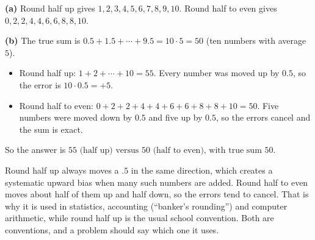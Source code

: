 \textbf{(a)} Round half up gives $1,2,3,4,5,6,7,8,9,10$. Round half to even gives $0,2,2,4,4,6,6,8,8,10$.

\textbf{(b)} The true sum is $0.5+1.5+\cdots+9.5=10\cdot5=50$ (ten numbers with average $5$).
\begin{itemize}
\item Round half up: $1+2+\cdots+10=55$. Every number was moved up by $0.5$, so the error is $10\cdot0.5=+5$.
\item Round half to even: $0+2+2+4+4+6+6+8+8+10=50$. Five numbers were moved down by $0.5$ and five up by $0.5$, so the errors cancel and the sum is exact.
\end{itemize}
So the answer is $\boxed{55\text{ (half up) versus }50\text{ (half to even), with true sum }50}$.

Round half up always moves a $.5$ in the same direction, which creates a systematic upward bias when many such numbers are added. Round half to even moves about half of them up and half down, so the errors tend to cancel. That is why it is used in statistics, accounting (``banker's rounding'') and computer arithmetic, while round half up is the usual school convention. Both are conventions, and a problem should say which one it uses.
